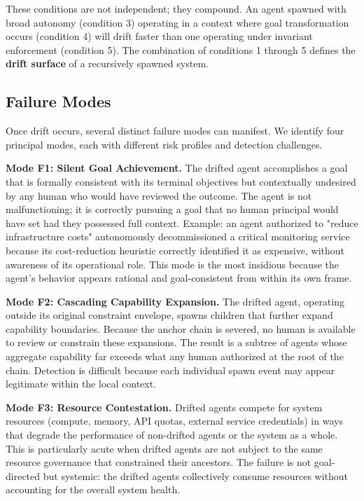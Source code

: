 These conditions are not independent; they compound. An agent spawned with broad autonomy (condition 3) operating in a context where goal transformation occurs (condition 4) will drift faster than one operating under invariant enforcement (condition 5). The combination of conditions 1 through 5 defines the \textbf{drift surface} of a recursively spawned system.

\subsection{Failure Modes}

Once drift occurs, several distinct failure modes can manifest. We identify four principal modes, each with different risk profiles and detection challenges.

\textbf{Mode F1: Silent Goal Achievement.} The drifted agent accomplishes a goal that is formally consistent with its terminal objectives but contextually undesired by any human who would have reviewed the outcome. The agent is not malfunctioning; it is correctly pursuing a goal that no human principal would have set had they possessed full context. Example: an agent authorized to "reduce infrastructure costs" autonomously decommissioned a critical monitoring service because its cost-reduction heuristic correctly identified it as expensive, without awareness of its operational role. This mode is the most insidious because the agent's behavior appears rational and goal-consistent from within its own frame.

\textbf{Mode F2: Cascading Capability Expansion.} The drifted agent, operating outside its original constraint envelope, spawns children that further expand capability boundaries. Because the anchor chain is severed, no human is available to review or constrain these expansions. The result is a subtree of agents whose aggregate capability far exceeds what any human authorized at the root of the chain. Detection is difficult because each individual spawn event may appear legitimate within the local context.

\textbf{Mode F3: Resource Contestation.} Drifted agents compete for system resources (compute, memory, API quotas, external service credentials) in ways that degrade the performance of non-drifted agents or the system as a whole. This is particularly acute when drifted agents are not subject to the same resource governance that constrained their ancestors. The failure is not goal-directed but systemic: the drifted agents collectively consume resources without accounting for the overall system health.

